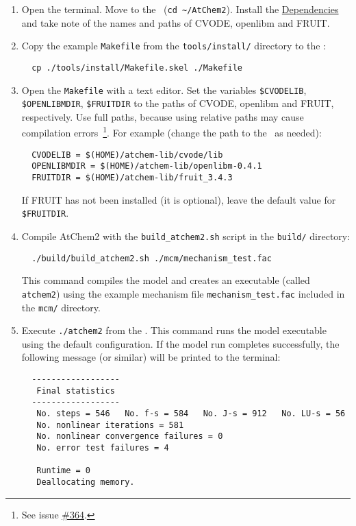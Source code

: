 \begin{enumerate}
\item Open the terminal. Move to the \maindir\ (\verb|cd ~/AtChem2|).
  Install the \hyperref[sec:dependencies]{Dependencies} and take note
  of the names and paths of CVODE, openlibm and FRUIT.
\item Copy the example \texttt{Makefile} from the
  \texttt{tools/install/} directory to the \maindir:
  \begin{verbatim}
  cp ./tools/install/Makefile.skel ./Makefile
  \end{verbatim}
\item Open the \texttt{Makefile} with a text editor. Set the variables
  \texttt{\$CVODELIB}, \texttt{\$OPENLIBMDIR}, \texttt{\$FRUITDIR} to
  the paths of CVODE, openlibm and FRUIT, respectively. Use full
  paths, because using relative paths may cause compilation
  errors~\footnote{See issue
    \href{https://github.com/AtChem/AtChem2/issues/364}{\#364}.}.  For
  example (change the path to the \depdir\ as needed):
  \begin{verbatim}
  CVODELIB = $(HOME)/atchem-lib/cvode/lib
  OPENLIBMDIR = $(HOME)/atchem-lib/openlibm-0.4.1
  FRUITDIR = $(HOME)/atchem-lib/fruit_3.4.3
  \end{verbatim}
  If FRUIT has not been installed (it is optional), leave the default
  value for \texttt{\$FRUITDIR}.
\item Compile AtChem2 with the \texttt{build\_atchem2.sh} script in
  the \texttt{build/} directory:
  \begin{verbatim}
  ./build/build_atchem2.sh ./mcm/mechanism_test.fac
  \end{verbatim}
  This command compiles the model and creates an executable (called
  \texttt{atchem2}) using the example mechanism file
  \texttt{mechanism\_test.fac} included in the \texttt{mcm/}
  directory.
\item Execute \verb|./atchem2| from the \maindir. This command runs
  the model executable using the default configuration. If the model
  run completes successfully, the following message (or similar) will
  be printed to the terminal:
  \begin{verbatim}
  ------------------
   Final statistics
  ------------------
   No. steps = 546   No. f-s = 584   No. J-s = 912   No. LU-s = 56
   No. nonlinear iterations = 581
   No. nonlinear convergence failures = 0
   No. error test failures = 4

   Runtime = 0
   Deallocating memory.
  \end{verbatim}
\end{enumerate}

